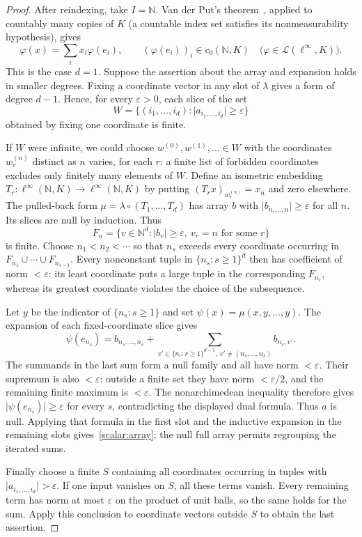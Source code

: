 \documentclass[11pt]{amsart}
\theoremstyle{definition}
\theoremstyle{remark}
\numberwithin{equation}{section}
\newcommand{\N}{\mathbb N}
\newcommand{\cL}{\mathcal L}
\newcommand{\linf}{\ell^\infty}
\newcommand{\abs}[1]{\lvert #1\rvert}
\theoremstyle{plain}
\theoremstyle{definition}
\theoremstyle{plain}
\begin{document}
\begin{proof}
After reindexing, take $I=\N$. Van der Put's theorem~\cite[Th\'eor\`eme~4.1]{VdP}, applied to countably
many copies of $K$ (a countable index set satisfies its nonmeasurability hypothesis), gives
\[
 \varphi(x)=\sum_i x_i\varphi(e_i),\qquad (\varphi(e_i))_i\in c_0(\N,K)
 \quad\bigl(\varphi\in\cL(\linf,K)\bigr).
\]
This is the case $d=1$. Suppose the assertion about the array and expansion holds in smaller degrees.
Fixing a coordinate vector in any slot of $\lambda$ gives a form of degree $d-1$. Hence, for every
$\varepsilon>0$, each slice of the set
\[
 W=\{(i_1,\dots,i_d):\abs{a_{i_1,\dots,i_d}}\ge\varepsilon\}
\]
obtained by fixing one coordinate is finite.

If $W$ were infinite, we could choose $w^{(0)},w^{(1)},\ldots\in W$ with the coordinates
$w^{(n)}_r$ distinct as $n$ varies, for each $r$: a finite list of forbidden coordinates excludes only
finitely many elements of $W$. Define an isometric embedding $T_r\colon\linf(\N,K)\to\linf(\N,K)$
by putting $(T_rx)_{w^{(n)}_r}=x_n$ and zero elsewhere. The pulled-back form
$\mu=\lambda\circ(T_1,\dots,T_d)$ has array $b$ with $\abs{b_{n,\dots,n}}\ge\varepsilon$ for all $n$.
Its slices are null by induction. Thus
\[
 F_n=\{v\in\N^d:\abs{b_v}\ge\varepsilon,\ v_r=n\text{ for some }r\}
\]
is finite. Choose $n_1<n_2<\cdots$ so that $n_s$ exceeds every coordinate occurring in
$F_{n_1}\cup\cdots\cup F_{n_{s-1}}$. Every nonconstant tuple in $\{n_s:s\ge1\}^d$ then has coefficient
of norm $<\varepsilon$: its least coordinate puts a large tuple in the corresponding $F_{n_r}$,
whereas its greatest coordinate violates the choice of the subsequence.

Let $y$ be the indicator of $\{n_s:s\ge1\}$ and set $\psi(x)=\mu(x,y,\dots,y)$. The expansion of each
fixed-coordinate slice gives
\[
 \psi(e_{n_s})
 =b_{n_s,\dots,n_s}
   +\sum_{v'\in\{n_r:r\ge1\}^{d-1},\ v'\ne(n_s,\dots,n_s)}b_{n_s,v'}.
\]
The summands in the last sum form a null family and all have norm $<\varepsilon$. Their supremum is
also $<\varepsilon$: outside a finite set they have norm $<\varepsilon/2$, and the remaining finite
maximum is $<\varepsilon$. The nonarchimedean inequality therefore gives
$\abs{\psi(e_{n_s})}\ge\varepsilon$ for every $s$, contradicting the displayed dual formula.
Thus $a$ is null. Applying that formula in the first slot and the inductive expansion in the remaining
slots gives~\eqref{scalar:array}; the null full array permits regrouping the iterated sums.

Finally choose a finite $S$ containing all coordinates occurring in tuples with $\abs{a_{i_1,\dots,i_d}}
>\varepsilon$. If one input vanishes on $S$, all these terms vanish. Every remaining term has norm at
most $\varepsilon$ on the product of unit balls, so the same holds for the sum. Apply this conclusion to
coordinate vectors outside $S$ to obtain the last assertion.
\end{proof}
\end{document}
